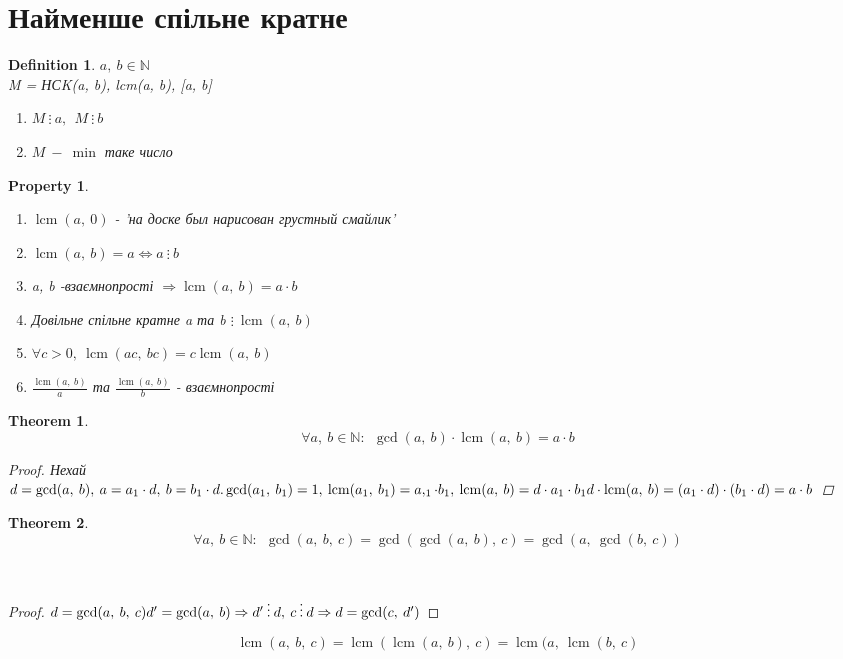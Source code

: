 \documentclass[a4paper,12pt]{bookest}
\newtheorem{theorem}{Theorem}[section]
\newtheorem{definition}{Definition}[section]
\newtheorem*{property*}{Property}
\DeclareMathOperator{\lcm}{lcm}
\begin{document}
\section{Найменше спільне кратне}
\begin{definition}

$a,\>b\in\mathbb{N}$\\
M = НСK(a, b), lcm(a, b), [a, b]
\begin{enumerate}
	\item $M\>\vdots\>a,\>\>M\>\vdots\>b$
	\item $M\>-\>\min$ таке число
\end{enumerate}
\end{definition}
\begin{property*}$ $
	\begin{enumerate}
		\item $\lcm(a,\>0)$ - 'на доске был нарисован грустный смайлик'
		\item $\lcm(a,\>b) = a\Leftrightarrow a\>\vdots\>b$
		\item a, b -взаємнопрості $\Rightarrow\lcm(a,\>b)=a\cdot b$
		\item Довільне спільне кратне a та b $\vdots\>\lcm(a,\>b)$
		\item $\forall c>0,\>\lcm(ac,\>bc)=c\lcm(a,\>b)$
		\item $\frac{\lcm(a,\>b)}{a}$ та $\frac{\lcm(a,\>b)}{b}$ - взаємнопрості
	\end{enumerate}
\end{property*}
\begin{theorem}
	$$\forall a,\>b\in\mathbb{N}:\>\>\gcd(a,\>b)\cdot\lcm(a,\>b)=a\cdot b$$
	\begin{proof}
		Нехай $d=\gcd(a,\>b),\>a=a_1\cdot d,\>b=b_1\cdot d.\\\gcd(a_1,\>b_1)=1,\>\lcm(a_1,\>b_1)=a,_1\cdot b_1,\>\lcm(a,\>b)=d\cdot a_1\cdot b_1\\ d\cdot\lcm(a,\>b)=(a_1\cdot d)\cdot(b_1\cdot d)=a\cdot b$
	\end{proof}
\end{theorem}
\begin{theorem}
	$$\forall a,\>b\in\mathbb{N}:\>\>\gcd(a,\>b,\>c)=\gcd(\gcd(a,\>b),\>c)=\gcd(a,\>\gcd(b,\>c))$$
\end{theorem}$ $
	\begin{proof}
		$d=\gcd(a,\>b,\>c)\\d'=\gcd(a,\>b)\Rightarrow d'\>\vdots\>d,\>c\>\vdots\>d\Rightarrow d=\gcd(c,\>d')$
	\end{proof}
$$\lcm(a,\>b,\>c)=\lcm(\lcm(a,\>b),\>c)=\lcm(a,\>\lcm(b,\>c)$$
\end{document}
